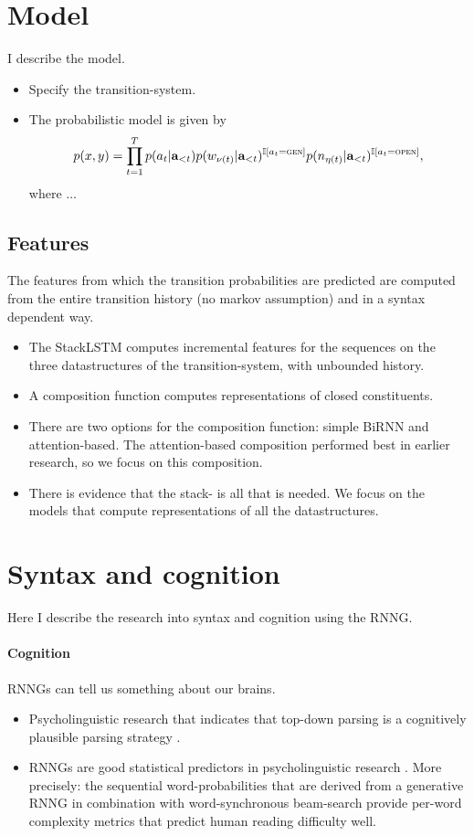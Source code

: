 % 

\section{Model}
I describe the model.
\begin{itemize}
  \item Specify the transition-system.
  \item The probabilistic model is given by
  \begin{equation}
    p(x, y) = \prod_{t=1}^T p(a_t | \mathbf{a}_{<t}) p(w_{\nu(t)} | \mathbf{a}_{<t} )^{ \mathbb{I}[a_t = \textsc{gen}] } p(n_{\eta(t)} | \mathbf{a}_{<t} )^{ \mathbb{I}[a_t = \textsc{open}] },
  \end{equation}
  where $\dots$
\end{itemize}

\subsection{Features}
The features from which the transition probabilities are predicted are computed from the entire transition history (no markov assumption) and in a syntax dependent way.
\begin{itemize}
  \item The StackLSTM computes incremental features for the sequences on the three datastructures of the transition-system, with unbounded history.
  \item A composition function computes representations of closed constituents.
  \item There are two options for the composition function: simple BiRNN and attention-based. The attention-based composition performed best in earlier research, so we focus on this composition.
  \item There is evidence that the stack- is all that is needed. We focus on the models that compute representations of all the datastructures.
\end{itemize}

\section{Syntax and cognition}
Here I describe the research into syntax and cognition using the RNNG.

\paragraph{Cognition} RNNGs can tell us something about our brains.
\begin{itemize}
  \item Psycholinguistic research that indicates that top-down parsing is a cognitively plausible parsing strategy \citep{Brennan+2016}.
  \item RNNGs are good statistical predictors in psycholinguistic research \citep{Hale+2018:beam}. More precisely: the sequential word-probabilities that are derived from a generative RNNG in combination with word-synchronous beam-search \citep{Stern+2017:beam} provide per-word complexity metrics that predict human reading difficulty well.
\end{itemize}

